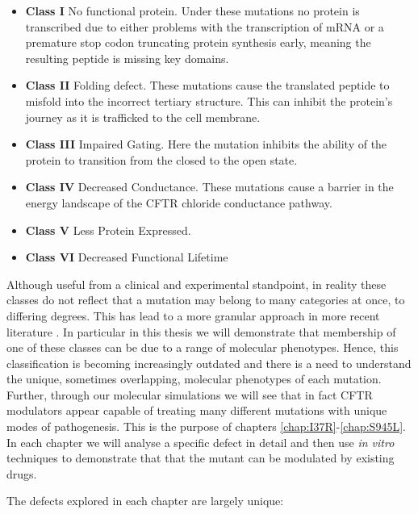 \begin{itemize}
	\item \textbf{Class I} No functional protein. Under these mutations no protein is transcribed due to either problems with the transcription of mRNA or a premature stop codon truncating protein synthesis early, meaning the resulting peptide is missing key domains. 
	\item \textbf{Class II} Folding defect. These mutations cause the translated peptide to misfold into the incorrect tertiary structure. This can inhibit the protein's journey as it is trafficked to the cell membrane. 
	\item \textbf{Class III} Impaired Gating. Here the mutation inhibits the ability of the protein to transition from the closed to the open state. 
	\item \textbf{Class IV} Decreased Conductance. These mutations cause a barrier in the energy landscape of the CFTR chloride conductance pathway.
	\item \textbf{Class V} Less Protein Expressed.  
	\item \textbf{Class VI} Decreased Functional Lifetime

\end{itemize}

Although useful from a clinical and experimental standpoint, in reality these classes do not reflect that a mutation may belong to many categories at once, to differing degrees. This has lead to a more granular approach in more recent literature \cite{veit2016}. In particular in this thesis we will demonstrate that membership of one of these classes can be due to a range of molecular phenotypes. Hence, this classification is becoming increasingly outdated and there is a need to understand the unique, sometimes overlapping, molecular phenotypes of each mutation. Further, through our molecular simulations we will see that in fact CFTR modulators appear capable of treating many different mutations with unique modes of pathogenesis. This is the purpose of chapters \ref{chap:I37R}-\ref{chap:S945L}. In each chapter we will analyse a specific defect in detail and then use \textit {in vitro} techniques to demonstrate that that the mutant can be modulated by existing drugs. 

The defects explored in each chapter are largely unique: 

